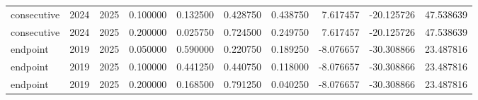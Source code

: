 \begin{tabular}{lrrrrrrrrr}
consecutive & 2024 & 2025 & 0.100000 & 0.132500 & 0.428750 & 0.438750 & 7.617457 & -20.125726 & 47.538639 \\
consecutive & 2024 & 2025 & 0.200000 & 0.025750 & 0.724500 & 0.249750 & 7.617457 & -20.125726 & 47.538639 \\
endpoint & 2019 & 2025 & 0.050000 & 0.590000 & 0.220750 & 0.189250 & -8.076657 & -30.308866 & 23.487816 \\
endpoint & 2019 & 2025 & 0.100000 & 0.441250 & 0.440750 & 0.118000 & -8.076657 & -30.308866 & 23.487816 \\
endpoint & 2019 & 2025 & 0.200000 & 0.168500 & 0.791250 & 0.040250 & -8.076657 & -30.308866 & 23.487816 \\
\bottomrule
\end{tabular}
